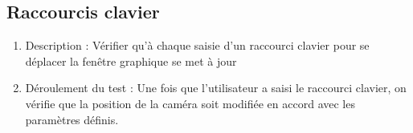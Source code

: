 \documentclass[12pt]{report}
\begin{document}
\subsection{Raccourcis clavier}
\begin{enumerate}
    \item Description : Vérifier qu'à chaque saisie d'un raccourci clavier pour se déplacer la fenêtre graphique se met à jour
    \item Déroulement du test : Une fois que l'utilisateur a saisi le raccourci clavier, on vérifie que la position de la caméra soit modifiée en accord avec les paramètres définis.
\end{enumerate}



\end{document}
